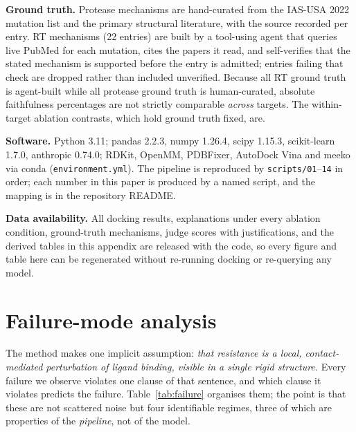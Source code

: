 \documentclass{article}
\begin{document}
\textbf{Ground truth.} Protease mechanisms are hand-curated from the IAS-USA 2022
mutation list and the primary structural literature, with the source recorded per
entry. RT mechanisms (22 entries) are built by a tool-using agent that queries
live PubMed for each mutation, cites the papers it read, and self-verifies that
the stated mechanism is supported before the entry is admitted; entries failing
that check are dropped rather than included unverified. Because all RT ground
truth is agent-built while all protease ground truth is human-curated, absolute
faithfulness percentages are not strictly comparable \emph{across} targets. The
within-target ablation contrasts, which hold ground truth fixed, are.

\textbf{Software.} Python 3.11; pandas 2.2.3, numpy 1.26.4, scipy 1.15.3,
scikit-learn 1.7.0, anthropic 0.74.0; RDKit, OpenMM, PDBFixer, AutoDock Vina and
meeko via conda (\texttt{environment.yml}). The pipeline is reproduced by
\texttt{scripts/01}--\texttt{14} in order; each number in this paper is produced by
a named script, and the mapping is in the repository README.

\textbf{Data availability.} All docking results, explanations under every ablation
condition, ground-truth mechanisms, judge scores with justifications, and the
derived tables in this appendix are released with the code, so every figure and
table here can be regenerated without re-running docking or re-querying any model.

\section{Failure-mode analysis}
\label{app:failure}

The method makes one implicit assumption: \emph{that resistance is a local,
contact-mediated perturbation of ligand binding, visible in a single rigid
structure.} Every failure we observe violates one clause of that sentence, and
which clause it violates predicts the failure. Table~\ref{tab:failure} organises
them; the point is that these are not scattered noise but four identifiable
regimes, three of which are properties of the \emph{pipeline}, not of the model.
\end{document}

